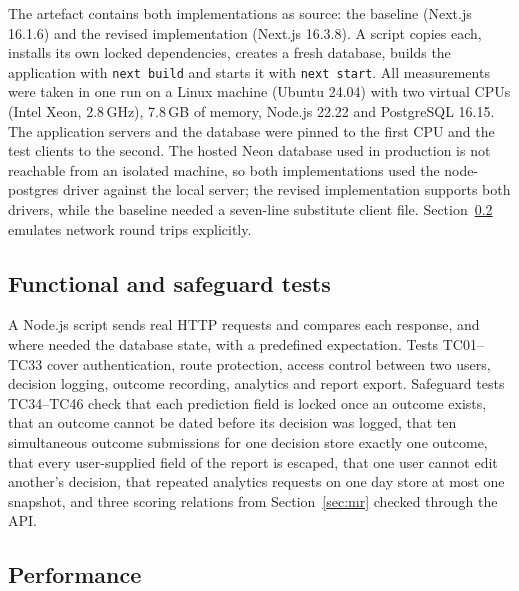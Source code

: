 \documentclass[12pt,a4paper]{article}
\begin{document}
The artefact contains both implementations as source: the baseline (Next.js 16.1.6) and the revised implementation (Next.js 16.3.8). A script copies each, installs its own locked dependencies, creates a fresh database, builds the application with \texttt{next build} and starts it with \texttt{next start}. All measurements were taken in one run on a Linux machine (Ubuntu 24.04) with two virtual CPUs (Intel Xeon, 2.8\,GHz), 7.8\,GB of memory, Node.js 22.22 and PostgreSQL 16.15. The application servers and the database were pinned to the first CPU and the test clients to the second. The hosted Neon database used in production is not reachable from an isolated machine, so both implementations used the node-postgres driver against the local server; the revised implementation supports both drivers, while the baseline needed a seven-line substitute client file. Section~\ref{sec:net} emulates network round trips explicitly.

\subsection{Functional and safeguard tests}\label{sec:functests}

A Node.js script sends real HTTP requests and compares each response, and where needed the database state, with a predefined expectation. Tests TC01--TC33 cover authentication, route protection, access control between two users, decision logging, outcome recording, analytics and report export. Safeguard tests TC34--TC46 check that each prediction field is locked once an outcome exists, that an outcome cannot be dated before its decision was logged, that ten simultaneous outcome submissions for one decision store exactly one outcome, that every user-supplied field of the report is escaped, that one user cannot edit another's decision, that repeated analytics requests on one day store at most one snapshot, and three scoring relations from Section~\ref{sec:mr} checked through the API.

\subsection{Performance}\label{sec:net}
\end{document}

